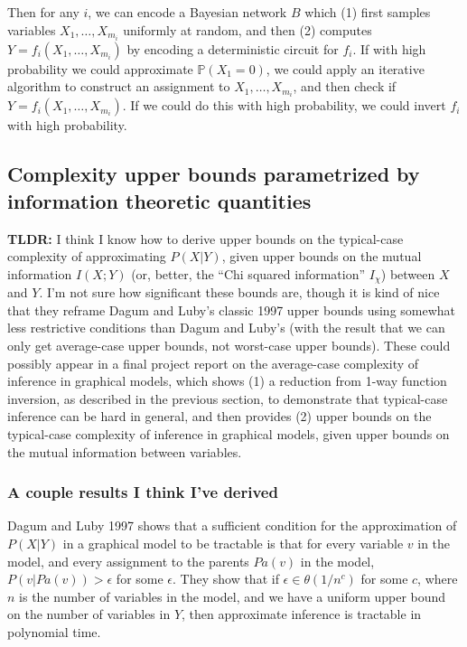 \documentclass{article}
\begin{document}
\noindent Then for any $i$, we can encode a Bayesian network $B$ which (1) first samples variables $X_1, \dots, X_{m_i}$ uniformly at random, and then (2) computes $Y = f_i(X_1, \dots, X_{m_i})$ by encoding a deterministic circuit for $f_i$.
If with high probability we could approximate $\mathbb{P}(X_1 = 0)$, we could apply an iterative algorithm to construct an assignment to $X_1, \dots, X_{m_i}$, and then check if $Y = f_i(X_1, \dots, X_{m_i})$.  If we could do this with high probability, we could invert $f_i$ with high probability.

\subsection{Complexity upper bounds parametrized by information theoretic quantities}

\textbf{TLDR:} I think I know how to derive upper bounds on the typical-case complexity of approximating $P(X | Y)$, given upper bounds on the mutual information $I(X ; Y)$ (or, better, the ``Chi squared information'' $I_\chi$) between $X$ and $Y$.  I'm not sure how significant these bounds are, though it is kind of nice that they reframe Dagum and Luby's classic 1997 upper bounds using somewhat less restrictive conditions than Dagum and Luby's (with the result that we can only get average-case upper bounds, not worst-case upper bounds).  These could possibly appear in a final project report on the average-case complexity of inference in graphical models, which shows (1) a reduction from 1-way function inversion, as described in the previous section, to demonstrate that typical-case inference can be hard in general, and then provides (2) upper bounds on the typical-case complexity of inference in graphical models, given upper bounds on the mutual information between variables.

\subsubsection{A couple results I think I've derived}
Dagum and Luby 1997 shows that a sufficient condition for the approximation of $P(X | Y)$ in a graphical model to be tractable is that for every variable $v$ in the model, and every assignment to the parents $Pa(v)$ in the model, $P(v | Pa(v))> \epsilon$ for some $\epsilon$.
They show that if $\epsilon \in \theta(1/n^c)$ for some $c$, where $n$ is the number of variables in the model, and we have a uniform upper bound on the number of variables in $Y$, then approximate inference is tractable in polynomial time.
\end{document}
